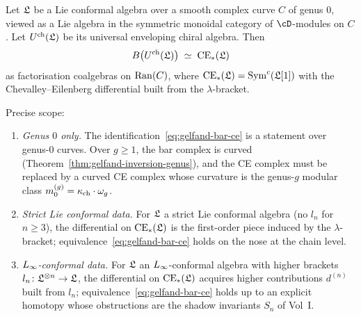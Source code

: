 \begin{theorem}
\label{thm:gelfand-bar-ce-chiral}
\ClaimStatusDerivation{}
Let $\mathfrak{L}$ be a Lie conformal algebra over a smooth complex curve
$C$ of genus $0$, viewed as a Lie algebra in the symmetric
monoidal category of $\cD$-modules on $C$. Let
$U^{\mathrm{ch}}(\mathfrak{L})$ be its universal enveloping chiral
algebra.  Then
\begin{equation}
\label{eq:gelfand-bar-ce}
  B\bigl(U^{\mathrm{ch}}(\mathfrak{L})\bigr)
  \;\simeq\;
  \mathrm{CE}_*(\mathfrak{L})
\end{equation}
as factorisation coalgebras on $\mathrm{Ran}(C)$, where
$\mathrm{CE}_*(\mathfrak{L}) = \mathrm{Sym}^c(\mathfrak{L}[1])$ with the Chevalley--Eilenberg
differential built from the $\lambda$-bracket.

Precise scope:
\begin{enumerate}[label=\textup{(\alph*)}]
\item \emph{Genus $0$ only.} The identification~\eqref{eq:gelfand-bar-ce}
is a statement over genus-$0$ curves. Over $g \geq 1$, the
bar complex is curved (Theorem~\ref{thm:gelfand-inversion-genus}),
and the CE complex must be replaced by a curved CE complex whose
curvature is the genus-$g$ modular class
$m_0^{(g)} = \kappa_{\mathrm{ch}} \cdot \omega_g$.

\item \emph{Strict Lie conformal data.} For $\mathfrak{L}$ a strict Lie
conformal algebra (no $l_n$ for $n \geq 3$), the differential
on $\mathrm{CE}_*(\mathfrak{L})$ is the first-order piece induced by the
$\lambda$-bracket; equivalence~\eqref{eq:gelfand-bar-ce} holds
on the nose at the chain level.

\item \emph{$L_\infty$-conformal data.} For $\mathfrak{L}$ an $L_\infty$-conformal
algebra with higher brackets $l_n \colon \mathfrak{L}^{\otimes n} \to \mathfrak{L}$,
the differential on $\mathrm{CE}_*(\mathfrak{L})$ acquires higher contributions
$d^{(n)}$ built from $l_n$; equivalence~\eqref{eq:gelfand-bar-ce}
holds up to an explicit homotopy whose obstructions are the
shadow invariants $S_n$ of Vol~I.
\end{enumerate}
\end{theorem}


